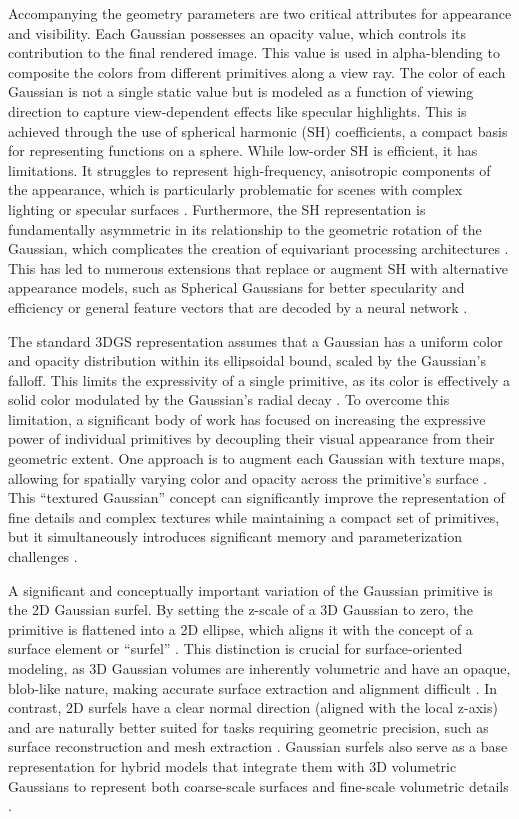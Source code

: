 \documentclass[11pt]{article}
\begin{document}
Accompanying the geometry parameters are two critical attributes for appearance and visibility. Each Gaussian possesses an opacity value, which controls its contribution to the final rendered image. This value is used in alpha-blending to composite the colors from different primitives along a view ray. The color of each Gaussian is not a single static value but is modeled as a function of viewing direction to capture view-dependent effects like specular highlights. This is achieved through the use of spherical harmonic (SH) coefficients, a compact basis for representing functions on a sphere. While low-order SH is efficient, it has limitations. It struggles to represent high-frequency, anisotropic components of the appearance, which is particularly problematic for scenes with complex lighting or specular surfaces \cite{ref12,ref13}. Furthermore, the SH representation is fundamentally asymmetric in its relationship to the geometric rotation of the Gaussian, which complicates the creation of equivariant processing architectures \cite{ref14}. This has led to numerous extensions that replace or augment SH with alternative appearance models, such as Spherical Gaussians for better specularity and efficiency \cite{ref12,ref15} or general feature vectors that are decoded by a neural network \cite{ref16}.

The standard 3DGS representation assumes that a Gaussian has a uniform color and opacity distribution within its ellipsoidal bound, scaled by the Gaussian's falloff. This limits the expressivity of a single primitive, as its color is effectively a solid color modulated by the Gaussian's radial decay \cite{ref17}. To overcome this limitation, a significant body of work has focused on increasing the expressive power of individual primitives by decoupling their visual appearance from their geometric extent. One approach is to augment each Gaussian with texture maps, allowing for spatially varying color and opacity across the primitive's surface \cite{ref17,ref18}. This ``textured Gaussian'' concept can significantly improve the representation of fine details and complex textures while maintaining a compact set of primitives, but it simultaneously introduces significant memory and parameterization challenges \cite{ref19,ref20}.

A significant and conceptually important variation of the Gaussian primitive is the 2D Gaussian surfel. By setting the z-scale of a 3D Gaussian to zero, the primitive is flattened into a 2D ellipse, which aligns it with the concept of a surface element or ``surfel'' \cite{ref21}. This distinction is crucial for surface-oriented modeling, as 3D Gaussian volumes are inherently volumetric and have an opaque, blob-like nature, making accurate surface extraction and alignment difficult \cite{ref22}. In contrast, 2D surfels have a clear normal direction (aligned with the local z-axis) and are naturally better suited for tasks requiring geometric precision, such as surface reconstruction and mesh extraction \cite{ref21,ref23}. Gaussian surfels also serve as a base representation for hybrid models that integrate them with 3D volumetric Gaussians to represent both coarse-scale surfaces and fine-scale volumetric details \cite{ref24}.
\end{document}
